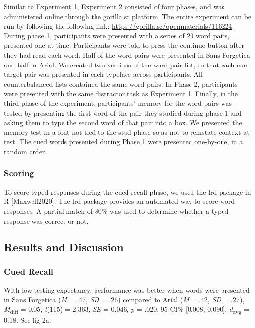 \documentclass[
  english,
  man]{apa6}
\begin{document}
Similar to Experiment 1, Experiment 2 consisted of four phases, and was administered online through the gorilla.sc platform. The entire experiment can be run by following the following link: \url{https://gorilla.sc/openmaterials/116224}. During phase 1, participants were presented with a series of 20 word pairs, presented one at time. Participants were told to press the continue button after they had read each word. Half of the word pairs were presented in
Sans Forgetica and half in Arial. We created two versions of the word pair list, so that each cue-target pair was presented in each typeface across participants. All counterbalanced lists contained the same word pairs. In Phase 2, participants were presented with the same distractor task as Experiment 1. Finally, in the third phase of the experiment, participants' memory for the word pairs was tested by presenting the first word of the pair they studied during phase 1 and asking them to type the second word of that pair into a box. We presented the memory test in a font not tied to the stud phase so as not to reinstate context at test. The cued words presented during Phase 1 were presented one-by-one, in a random order.

\hypertarget{scoring}{%
\subsubsection{Scoring}\label{scoring}}

To score typed responses during the cued recall phase, we used the lrd package in R {[}Maxwell2020{]}. The lrd package provides an automated way to score word responses. A partial match of 80\% was used to determine whether a typed response was correct or not.

\hypertarget{results-and-discussion-1}{%
\subsection{Results and Discussion}\label{results-and-discussion-1}}

\hypertarget{cued-recall}{%
\subsubsection{Cued Recall}\label{cued-recall}}

With low testing expectancy, performance was better when words were presented in Sans Forgetica (\emph{M} = .47, \emph{SD} = .26) compared to Arial (\emph{M} = .42, \emph{SD} = .27), \emph{M}\textsubscript{diff} = 0.05, \emph{t}(115) = 2.363, \emph{SE} = 0.046, \emph{p} = .020, 95 CI\% {[}0.008, 0.090{]}, \emph{d}\textsubscript{avg} = 0.18. See fig 2a.
\end{document}
